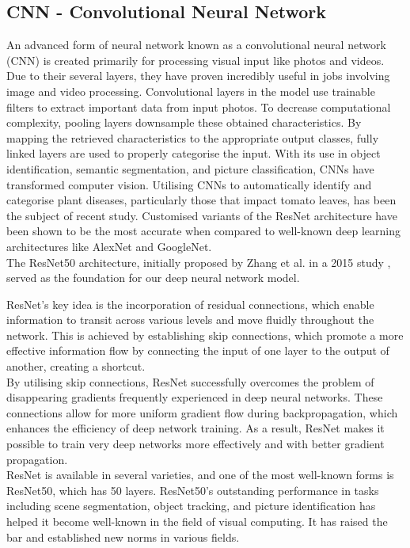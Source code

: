 \documentclass[conference]{IEEEtran}
\begin{document}
\subsection{CNN - Convolutional Neural Network}

An advanced form of neural network known as a convolutional neural network (CNN) is created primarily for processing visual input like photos and videos. Due to their several layers, they have proven incredibly useful in jobs involving image and video processing. Convolutional layers in the model use trainable filters to extract important data from input photos. To decrease computational complexity, pooling layers downsample these obtained characteristics. By mapping the retrieved characteristics to the appropriate output classes, fully linked layers are used to properly categorise the input. With its use in object identification, semantic segmentation, and picture classification, CNNs have transformed computer vision. Utilising CNNs to automatically identify and categorise plant diseases, particularly those that impact tomato leaves, has been the subject of recent study. Customised variants of the ResNet architecture have been shown to be the most accurate when compared to well-known deep learning architectures like AlexNet and GoogleNet.\\

The ResNet50 architecture, initially proposed by Zhang et al. in a 2015 study \cite{Zhang_2021_WACV}, served as the foundation for our deep neural network model.

ResNet's key idea is the incorporation of residual connections, which enable information to transit across various levels and move fluidly throughout the network. This is achieved by establishing skip connections, which promote a more effective information flow by connecting the input of one layer to the output of another, creating a shortcut.\\

By utilising skip connections, ResNet successfully overcomes the problem of disappearing gradients frequently experienced in deep neural networks. These connections allow for more uniform gradient flow during backpropagation, which enhances the efficiency of deep network training. As a result, ResNet makes it possible to train very deep networks more effectively and with better gradient propagation.\\

ResNet is available in several varieties, and one of the most well-known forms is ResNet50, which has 50 layers. ResNet50's outstanding performance in tasks including scene segmentation, object tracking, and picture identification has helped it become well-known in the field of visual computing. It has raised the bar and established new norms in various fields.
\end{document}
